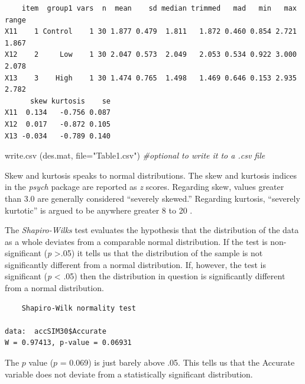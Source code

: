 \documentclass[
  english,
]{book}
\newenvironment{Shaded}{\begin{snugshade}}{\end{snugshade}}
\newcommand{\AttributeTok}[1]{\textcolor[rgb]{0.77,0.63,0.00}{#1}}
\newcommand{\CommentTok}[1]{\textcolor[rgb]{0.56,0.35,0.01}{\textit{#1}}}
\newcommand{\FunctionTok}[1]{\textcolor[rgb]{0.00,0.00,0.00}{#1}}
\newcommand{\NormalTok}[1]{#1}
\newcommand{\SpecialCharTok}[1]{\textcolor[rgb]{0.00,0.00,0.00}{#1}}
\newcommand{\StringTok}[1]{\textcolor[rgb]{0.31,0.60,0.02}{#1}}
\begin{document}
\begin{verbatim}
    item  group1 vars  n  mean    sd median trimmed   mad   min   max range
X11    1 Control    1 30 1.877 0.479  1.811   1.872 0.460 0.854 2.721 1.867
X12    2     Low    1 30 2.047 0.573  2.049   2.053 0.534 0.922 3.000 2.078
X13    3    High    1 30 1.474 0.765  1.498   1.469 0.646 0.153 2.935 2.782
      skew kurtosis    se
X11  0.134   -0.756 0.087
X12  0.017   -0.872 0.105
X13 -0.034   -0.789 0.140
\end{verbatim}

\begin{Shaded}
\begin{Highlighting}[]
\FunctionTok{write.csv}\NormalTok{ (des.mat, }\AttributeTok{file=}\StringTok{"Table1.csv"}\NormalTok{) }\CommentTok{\#optional to write it to a .csv file}
\end{Highlighting}
\end{Shaded}

Skew and kurtosis speaks to normal distributions. The skew and kurtosis indices in the \emph{psych} package are reported as \emph{z} scores. Regarding skew, values greater than 3.0 are generally considered ``severely skewed.'' Regarding kurtosis, ``severely kurtotic'' is argued to be anywhere greater 8 to 20 \citep{kline_principles_2016}.

The \emph{Shapiro-Wilks} test evaluates the hypothesis that the distribution of the data as a whole deviates from a comparable normal distribution. If the test is non-significant (\emph{p} \textgreater.05) it tells us that the distribution of the sample is not significantly different from a normal distribution. If, however, the test is significant (\emph{p} \textless{} .05) then the distribution in question is significantly different from a normal distribution.

\begin{Shaded}
\end{Shaded}

\begin{verbatim}
    Shapiro-Wilk normality test

data:  accSIM30$Accurate
W = 0.97413, p-value = 0.06931
\end{verbatim}

The \(p\) value (\(p\) = 0.069) is just barely above .05. This tells us that the Accurate variable does not deviate from a statistically significant distribution.
\end{document}
